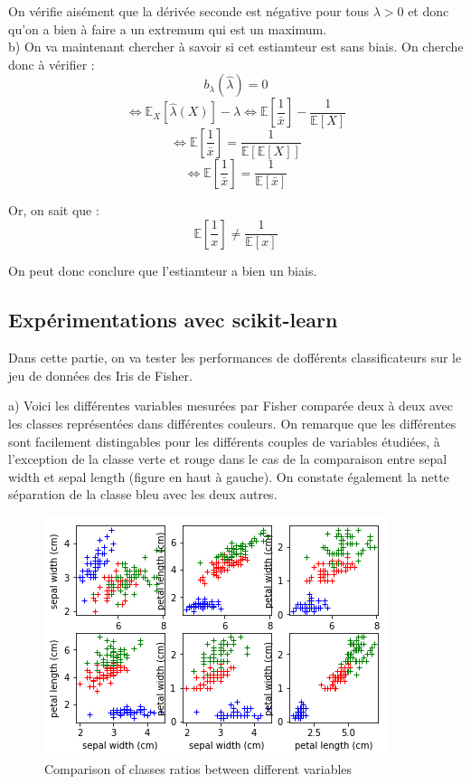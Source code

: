 \documentclass{article}
\begin{document}
On vérifie aisément que la dérivée seconde est négative pour tous $\lambda > 0$ et donc qu'on a bien à faire a un extremum qui est un maximum.\\

b) On va maintenant chercher à savoir si cet estiamteur est sans biais.
On cherche donc à vérifier :
$$
b_{\lambda}(\hat{\lambda}) = 0 
$$
$$
\Leftrightarrow \mathbb{E}_{X}\left [ \hat{\lambda}(X) \right ] - \lambda
\Leftrightarrow \mathbb{E}\left [ \frac{1}{\bar{x}} \right ] - \frac{1}{\mathbb{E}\left [ X \right ] } 
$$
$$
\Leftrightarrow \mathbb{E}\left [ \frac{1}{\bar{x}} \right ] = \frac{1}{\mathbb{E}\left [ \mathbb{E} \left [ X \right ] \right ] }
$$
$$
\Leftrightarrow \mathbb{E}\left [ \frac{1}{\bar{x}} \right ] = \frac{1}{\mathbb{E}\left [ \bar{x} \right ] }
$$

Or, on sait que :
$$
\mathbb{E}\left [ \frac{1}{x} \right ] \neq  \frac{1}{\mathbb{E}\left [ x \right ] }
$$

On peut donc conclure que l'estiamteur a bien un biais.

\subsection{Expérimentations avec scikit-learn}

Dans cette partie, on va tester les performances de dofférents classificateurs sur le jeu de données des Iris de Fisher. 

a) Voici les différentes variables mesurées par Fisher comparée deux à deux avec les classes représentées dans différentes couleurs. On remarque que les différentes sont facilement distingables pour les différents couples de variables étudiées, à l'exception de la classe verte et rouge dans le cas de la comparaison entre sepal width et sepal length (figure en haut à gauche). On constate également la nette séparation de la classe bleu avec les deux autres.

\begin{figure}[h!]
  \includegraphics[width=\linewidth]{classes.png}
  \caption{Comparison of classes ratios between different variables}
  \label{fig:classes}
\end{figure}
\newpage
\newpage
\end{document}
